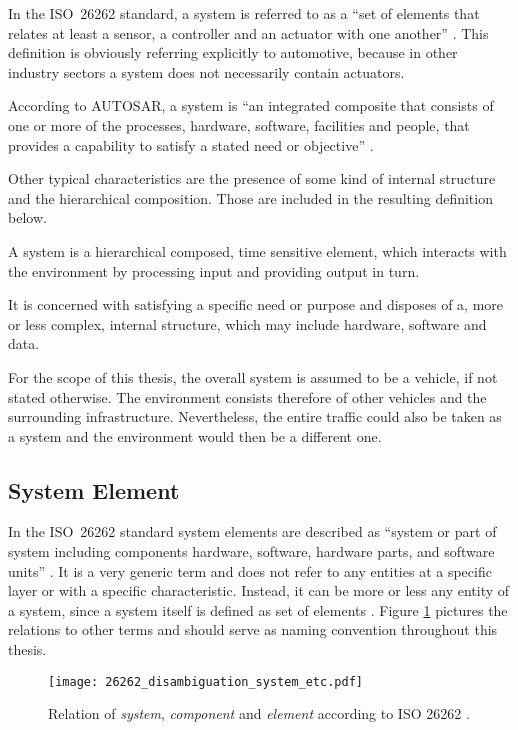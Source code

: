 In the \mbox{ISO 26262} standard, a system is referred to as a ``set of elements that relates at least a sensor, a controller and an actuator with one another'' \cite{iso26262:1}. This definition is obviously referring explicitly to automotive, because in other industry sectors a system does not necessarily contain actuators.

According to AUTOSAR, a system is ``an integrated composite that consists of one or more of the processes, hardware, software, facilities and people, that provides a capability to satisfy a stated need or objective'' \cite{autosar_glossary}.

Other typical characteristics are the presence of some kind of internal structure and the hierarchical composition. Those are included in the resulting definition below.

\begin{myquote}
A system is a hierarchical composed, time sensitive element, which interacts with the environment by processing input and providing output in turn.

It is concerned with satisfying a specific need or purpose and disposes of a, more or less complex, internal structure, which may include hardware, software and data.
\end{myquote}

For the scope of this thesis, the overall system is assumed to be a vehicle, if not stated otherwise. The environment consists therefore of other vehicles and the surrounding infrastructure. Nevertheless, the entire traffic could also be taken as a system and the environment would then be a different one.



\subsection{System Element}
\label{sec:system_element}
In the \mbox{ISO 26262} standard system elements are described as ``system or part of system including components hardware, software, hardware parts, and software units'' \cite{iso26262:1}. It is a very generic term and does not refer to any entities at a specific layer or with a specific characteristic. Instead, it can be more or less any entity of a system, since a system itself is defined as set of elements \cite{iso26262:1}. Figure \ref{fig:26262_disambiguation} pictures the relations to other terms and should serve as naming convention throughout this thesis.

\begin{figure}[!htbp]
\centering
\texttt{[image: 26262\_disambiguation\_system\_etc.pdf]}

\caption{Relation of \emph{system}, \emph{component} and \emph{element} according to ISO 26262 \cite{iso26262:course1}.}
\label{fig:26262_disambiguation}
\end{figure}


